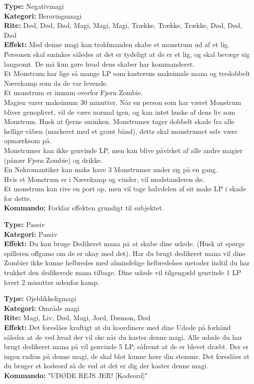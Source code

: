 \begin{zombie*}
\textbf{Type:} Negativmagi\\
\textbf{Kategori:} Berøringsmagi\\
\textbf{Rite:} Død, Død, Død, Magi, Magi, Magi, Trække, Trække, Trække, Død, Død, Død\\
\textbf{Effekt:} Med denne magi kan troldmanden skabe et monstrum ud af et lig. Personen skal sminkes således at det er tydeligt at de er et lig, og skal bevæge sig langsomt. De må kun gøre hvad dens skaber har kommanderet.\\
Et Monstrum har lige så mange LP som kasterens maksimale mana og tredobbelt Nævekamp som da de var levende.\\
Et monstrum er immun overfor Fjern Zombie.\\
Magien varer maksimum 30 minutter. Når en person som har været Monstrum bliver genoplivet, vil de være normal igen, og kan intet huske af dens liv som Monstrum. Husk at fjerne sminken. Monstrumer tager dobbelt skade fra alle hellige våben (markeret med et grønt bånd), dette skal monstrumet selv være opmærksom på.\\ 
Monstrumer kan ikke genvinde LP, men kan blive påvirket af alle andre magier (pånær Fjern Zombie) og drikke.\\
En Nekromantiker kan maks have 3 Monstrumer under sig på en gang. \\
Hvis et Monstrum er i Nævekamp og vinder, vil modstanderen dø.\\
Et monstrum kan rive en port op, men vil tage halvdelen af sit maks LP i skade for dette.\\
\textbf{Kommando:} Forklar effekten grundigt til subjektet.\\
\end{zombie*}


\begin{zombie*}
\textbf{Type:} Passiv\\
\textbf{Kategori:} Passiv\\
\textbf{Effekt:} Du kan bruge Dedikeret mana på at skabe dine udøde. (Husk at spørge spilleren offgame om de er okay med det). Har du brugt dedikeret mana vil dine Zombier ikke kunne helbredes med almindelige helbredelses metoder indtil du har trukket den dedikerede mana tilbage. Dine udøde vil tilgengæld genvinde 1 LP hvert 2 minutter udenfor kamp.
\end{zombie*}
\begin{zombie*}
\textbf{Type:} Øjeblikkeligmagi\\
\textbf{Kategori:} Område magi\\
\textbf{Rite:} Magi, Liv, Død, Magi, Jord, Dæmon, Død\\
\textbf{Effekt:} Det foreslåes kraftigt at du koordinere med dine Udøde på forhånd således at de ved hvad der vil ske når du kaster denne magi. Alle udøde du har brugt dedikeret mana på vil genvinde 5 LP, såfremt at de er blevet dræbt. Der er ingen radius på denne magi, de skal blot kunne høre din stemme. Det foreslåes at du bruger et kodeord så de ved at det er dig der kaster denne magi.\\
\textbf{Kommando:} "UDØDE REJS JER! [Kodeord]" 
\end{zombie*}

